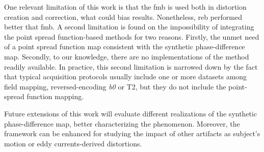 One relevant limitation of this work is that the \gls*{fmb} is
used both in distortion creation and correction, what could
bias results. Nonetheless, \gls*{reb} performed better that \gls*{fmb}.
A second limitation is found on the impossibility of integrating the
point spread function-based methods for two reasons.
Firstly, the unmet need of a point spread function map consistent
with the synthetic phase-difference map. Secondly, to our knowledge,
there are no implementations of the method readily available.
In practice, this second limitation is narrowed down by the
fact that typical acquisition protocols usually include one or more
datasets among field mapping, reversed-encoding \textit{b0} or T2,
but they do not include the point-spread function mapping.

Future extensions of this work will evaluate
different realizations of the synthetic phase-difference map,
better characterizing the phenomenon. Moreover, the
framework can be enhanced for studying the impact of 
other artifacts as subject's motion or eddy 
currents-derived distortions.